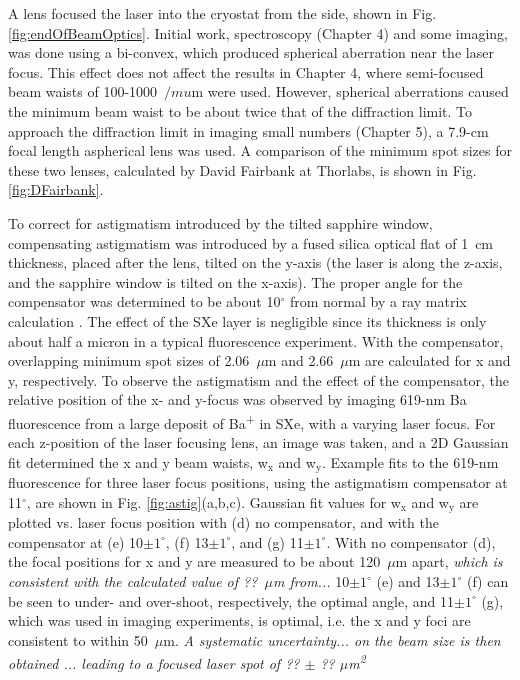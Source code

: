 A lens focused the laser into the cryostat from the side, shown in Fig. \ref{fig:endOfBeamOptics}.  Initial work, spectroscopy (Chapter 4) and some imaging, was done using a bi-convex, which produced spherical aberration near the laser focus.  This effect does not affect the results in Chapter 4, where semi-focused beam waists of 100-1000~$/mu$m were used.  However, spherical aberrations caused the minimum beam waist to be about twice that of the diffraction limit.  To approach the diffraction limit in imaging small numbers (Chapter 5), a 7.9-cm focal length aspherical lens was used.  A comparison of the minimum spot sizes for these two lenses, calculated by David Fairbank at Thorlabs, is shown in Fig. \ref{fig:DFairbank}.

To correct for astigmatism introduced by the tilted sapphire window, compensating astigmatism was introduced by a fused silica optical flat of 1~cm thickness, placed after the lens, tilted on the y-axis (the laser is along the z-axis, and the sapphire window is tilted on the x-axis).  The proper angle for the compensator was determined to be about 10$^{\circ}$ from normal by a ray matrix calculation \cite{raymatrix}.  The effect of the SXe layer is negligible since its thickness is only about half a micron in a typical fluorescence experiment.  With the compensator, overlapping minimum spot sizes of 2.06~$\mu$m and 2.66~$\mu$m are calculated for x and y, respectively.  To observe the astigmatism and the effect of the compensator, the relative position of the x- and y-focus was observed by imaging 619-nm Ba fluorescence from a large deposit of Ba\textsuperscript{+} in SXe, with a varying laser focus.  For each z-position of the laser focusing lens, an image was taken, and a 2D Gaussian fit determined the x and y beam waists, w$_{\text{x}}$ and w$_{\text{y}}$.  Example fits to the 619-nm fluorescence for three laser focus positions, using the astigmatism compensator at 11$^{\circ}$, are shown in Fig. \ref{fig:astig}(a,b,c).  Gaussian fit values for w$_{\text{x}}$ and w$_{\text{y}}$ are plotted vs. laser focus position with (d) no compensator, and with the compensator at (e) 10$\pm 1^{\circ}$, (f) 13$\pm 1^{\circ}$, and (g) {\color{red}11}$\pm 1^{\circ}$.  With no compensator (d), the focal positions for x and y are measured to be about {\color{red}120}~$\mu$m apart, \emph{\color{gray}which is consistent with the calculated value of {\color{red}??}~$\mu$m from...}  10$\pm 1^{\circ}$ (e) and 13$\pm 1^{\circ}$ (f) can be seen to under- and over-shoot, respectively, the optimal angle, and {\color{red}11}$\pm 1^{\circ}$ (g), which was used in imaging experiments, is optimal, i.e. the x and y foci are consistent to within 50~$\mu$m.  \emph{\color{gray}A systematic uncertainty... on the beam size is then obtained ... leading to a focused laser spot of ?? $\pm$ ?? $\mu$m\textsuperscript{2}}

